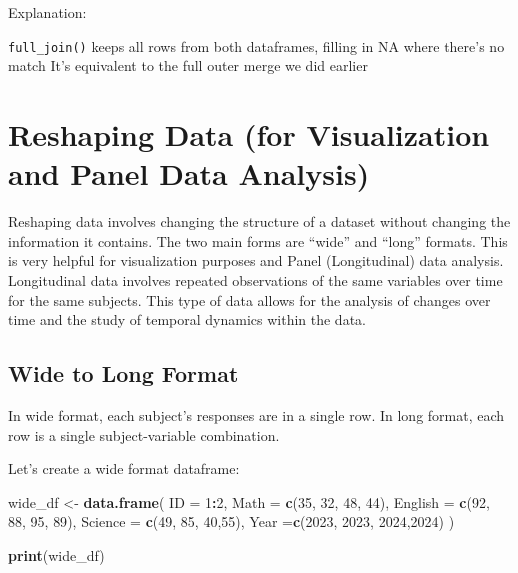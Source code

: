 \documentclass[
]{article}
\newenvironment{Shaded}{\begin{snugshade}}{\end{snugshade}}
\newcommand{\AttributeTok}[1]{\textcolor[rgb]{0.13,0.29,0.53}{#1}}
\newcommand{\DecValTok}[1]{\textcolor[rgb]{0.00,0.00,0.81}{#1}}
\newcommand{\FunctionTok}[1]{\textcolor[rgb]{0.13,0.29,0.53}{\textbf{#1}}}
\newcommand{\NormalTok}[1]{#1}
\newcommand{\OtherTok}[1]{\textcolor[rgb]{0.56,0.35,0.01}{#1}}
\newcommand{\SpecialCharTok}[1]{\textcolor[rgb]{0.81,0.36,0.00}{\textbf{#1}}}
\begin{document}
Explanation:

\texttt{full\_join()} keeps all rows from both dataframes, filling in NA
where there's no match It's equivalent to the full outer merge we did
earlier

\hypertarget{reshaping-data-for-visualization-and-panel-data-analysis}{%
\section{Reshaping Data (for Visualization and Panel Data
Analysis)}\label{reshaping-data-for-visualization-and-panel-data-analysis}}

Reshaping data involves changing the structure of a dataset without
changing the information it contains. The two main forms are ``wide''
and ``long'' formats. This is very helpful for visualization purposes
and Panel (Longitudinal) data analysis. Longitudinal data involves
repeated observations of the same variables over time for the same
subjects. This type of data allows for the analysis of changes over time
and the study of temporal dynamics within the data.

\hypertarget{wide-to-long-format}{%
\subsection{Wide to Long Format}\label{wide-to-long-format}}

In wide format, each subject's responses are in a single row. In long
format, each row is a single subject-variable combination.

Let's create a wide format dataframe:

\begin{Shaded}
\begin{Highlighting}[]
\NormalTok{wide\_df }\OtherTok{\textless{}{-}} \FunctionTok{data.frame}\NormalTok{(}
  \AttributeTok{ID =} \DecValTok{1}\SpecialCharTok{:}\DecValTok{2}\NormalTok{,}
  \AttributeTok{Math =} \FunctionTok{c}\NormalTok{(}\DecValTok{35}\NormalTok{, }\DecValTok{32}\NormalTok{, }\DecValTok{48}\NormalTok{, }\DecValTok{44}\NormalTok{),}
  \AttributeTok{English =} \FunctionTok{c}\NormalTok{(}\DecValTok{92}\NormalTok{, }\DecValTok{88}\NormalTok{, }\DecValTok{95}\NormalTok{, }\DecValTok{89}\NormalTok{),}
  \AttributeTok{Science =} \FunctionTok{c}\NormalTok{(}\DecValTok{49}\NormalTok{, }\DecValTok{85}\NormalTok{, }\DecValTok{40}\NormalTok{,}\DecValTok{55}\NormalTok{),}
  \AttributeTok{Year =}\FunctionTok{c}\NormalTok{(}\DecValTok{2023}\NormalTok{, }\DecValTok{2023}\NormalTok{, }\DecValTok{2024}\NormalTok{,}\DecValTok{2024}\NormalTok{)}
\NormalTok{)}

\FunctionTok{print}\NormalTok{(wide\_df)}
\end{Highlighting}
\end{Shaded}
\end{document}
